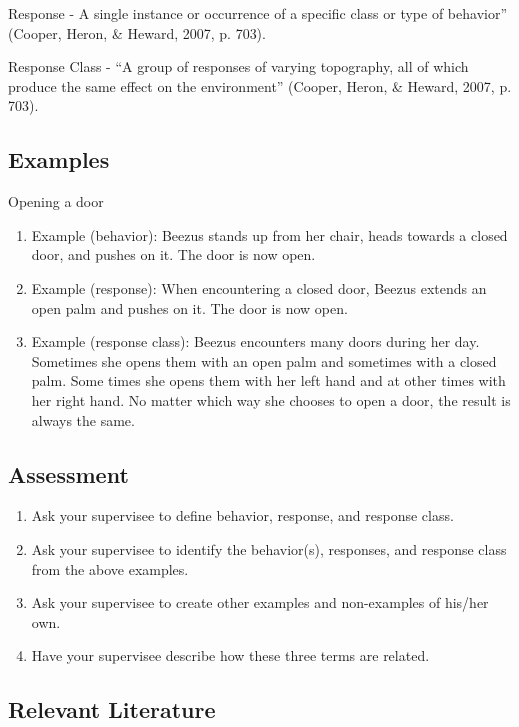 Response - A single instance or occurrence of a specific class or type of behavior'' (Cooper, Heron, \& Heward, 2007, p. 703).  

Response Class - ``A group of responses of varying topography, all of which produce the same effect on the environment'' (Cooper, Heron, \& Heward, 2007, p. 703).  
%
\subsection{Examples}
Opening a door
\begin{enumerate}
\item Example (behavior):  Beezus stands up from her chair, heads towards a closed door, and pushes on it.  The door is now open.  
\item Example (response): When encountering a closed door, Beezus extends an open palm and pushes on it.  The door is now open.   
\item Example (response class): Beezus encounters many doors during her day. Sometimes she opens them with an open palm and sometimes with a closed palm. Some times she opens them with her left hand and at other times with her right hand.  No matter which way she chooses to open a door, the result is always the same.  
%
\end{enumerate}
%
\subsection{Assessment}
\begin{enumerate}
\item Ask your supervisee to define behavior, response, and response class. 
\item Ask your supervisee to identify the behavior(s), responses, and response class from the above examples.  
\item Ask your supervisee to create other examples and non-examples of his/her own. 
\item Have your supervisee describe how these three terms are related. 
%
\end{enumerate}
%
\subsection{Relevant Literature}
\begin{refsection}
\nocite{test,alang2017police,clayton2018black}
\printbibliography[heading=none]
\end{refsection}
%
